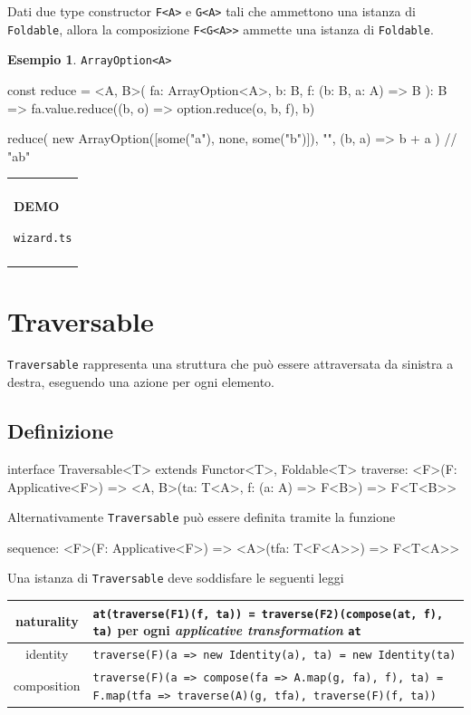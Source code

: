 \documentclass[12pt]{article}
\theoremstyle{definition}
\newtheorem{example}{Esempio}[section]
\newenvironment{demo}
    {\begin{center}
    \begin{tabular}{|p{0.9\textwidth}|}
    \hline\\
    }
    {
    \\\\\hline
    \end{tabular}
    \end{center}
    }
\newenvironment{code}
  {\vspace{0.5cm} \VerbatimEnvironment\begin{typescriptcode}}
  {\end{typescriptcode} \vspace{0.2cm}}
\begin{document}
Dati due type constructor \texttt{F<A>} e \texttt{G<A>} tali che ammettono una istanza di \texttt{Foldable}, allora la composizione \texttt{F<G<A>>}
ammette una istanza di \texttt{Foldable}.

\begin{example}
\texttt{ArrayOption<A>}

\begin{code}
const reduce = <A, B>(
  fa: ArrayOption<A>,
  b: B,
  f: (b: B, a: A) => B
): B => fa.value.reduce((b, o) => option.reduce(o, b, f), b)

reduce(
  new ArrayOption([some("a"), none, some("b")]),
  "",
  (b, a) => b + a
) // "ab"
\end{code}
\end{example}

\begin{demo}
\begin{center}
\textbf{DEMO}

\texttt{wizard.ts}
\end{center}
\end{demo}

\newpage

\section{Traversable}

\texttt{Traversable} rappresenta una struttura che può essere attraversata da sinistra a destra, eseguendo una azione per ogni elemento.

\subsection{Definizione}

\begin{code}
interface Traversable<T> extends Functor<T>, Foldable<T> {
  traverse: <F>(F: Applicative<F>) =>
    <A, B>(ta: T<A>, f: (a: A) => F<B>) => F<T<B>>
}
\end{code}

Alternativamente \texttt{Traversable} può essere definita tramite la funzione

\begin{code}
sequence: <F>(F: Applicative<F>) => <A>(tfa: T<F<A>>) => F<T<A>>
\end{code}

Una istanza di \texttt{Traversable} deve soddisfare le seguenti leggi

\begin{center}
\bgroup
\def\arraystretch{1.5}
\begin{tabular}{ |c|p{10cm}| }
\hline
naturality & \texttt{at(traverse(F1)(f, ta)) = traverse(F2)(compose(at, f), ta)} per ogni \emph{applicative transformation} \texttt{at} \\
\hline
identity & \texttt{traverse(F)(a => new Identity(a), ta) = new Identity(ta)} \\
\hline
composition & \texttt{traverse(F)(a => compose(fa => A.map(g, fa), f), ta) = F.map(tfa => traverse(A)(g, tfa), traverse(F)(f, ta))} \\
\hline
\end{tabular}
\egroup
\end{center}
\end{document}
